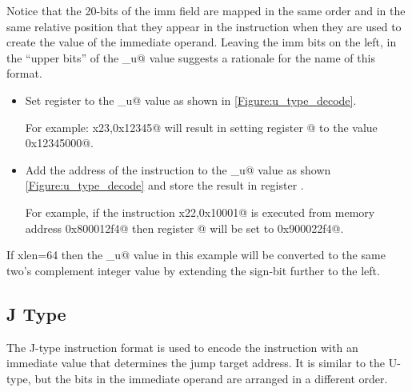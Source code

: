 Notice that the 20-bits of the imm field are mapped in the same order and 
in the same relative position that they appear in the instruction when 
they are used to create the value of the immediate operand.  
Leaving the imm bits on the left, in the ``upper bits'' of the \verb@imm_u@ 
value suggests a rationale for the name of this format.

\begin{itemize}
\item{}
\label{insn:lui}

Set register \verb@rd@ to the \verb@imm_u@ value as shown in \autoref{Figure:u_type_decode}.  

For example: \verb@lui x23,0x12345@ will result in setting register @ to 
the value \verb@0x12345000@.

\item{}
\label{insn:auipc}

Add the address of the instruction to the \verb@imm_u@ value as 
shown \autoref{Figure:u_type_decode} and store the result in register \verb@rd@.

For example, if the instruction \verb@auipc x22,0x10001@ is executed from
memory address \verb@0x800012f4@ then register @ will be set to 
\verb@0x900022f4@.
\end{itemize}


If \Gls{xlen}=64 then the \verb@imm_u@ value in this example will be converted 
to the same two's complement integer value by extending the sign-bit 
further to the left.




\subsection{J Type}
\label{insnformat:jtype}

The J-type instruction format is used to encode the \verb@jal@ instruction 
with an immediate value that determines the jump target address.
It is similar to the U-type, but the bits in the immediate operand are 
arranged in a different order.


